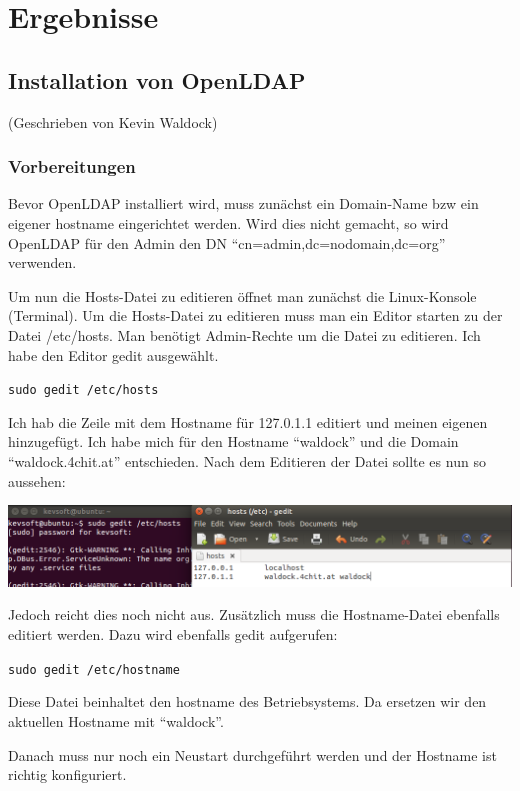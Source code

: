 
\section{Ergebnisse}
\label{sec:Ergebnisse}

\subsection{Installation von OpenLDAP}
(Geschrieben von Kevin Waldock)

\subsubsection{Vorbereitungen}
Bevor OpenLDAP installiert wird, muss zunächst ein Domain-Name bzw ein eigener hostname eingerichtet werden. Wird dies nicht gemacht, so wird OpenLDAP für den Admin den DN ``cn=admin,dc=nodomain,dc=org'' verwenden.

Um nun die Hosts-Datei zu editieren öffnet man zunächst die Linux-Konsole (Terminal). Um die Hosts-Datei zu editieren muss man ein Editor starten zu der Datei /etc/hosts. Man benötigt Admin-Rechte um die Datei zu editieren. Ich habe den Editor gedit ausgewählt.

\verb|sudo gedit /etc/hosts|

Ich hab die Zeile mit dem Hostname für 127.0.1.1 editiert und meinen eigenen hinzugefügt. Ich habe mich für den Hostname ``waldock'' und die Domain ``waldock.4chit.at'' entschieden. Nach dem Editieren der Datei sollte es nun so aussehen:

\begin{center}
	\includegraphics[width=1.0\linewidth]{images/a1_hostsfile.PNG}
\end{center}

Jedoch reicht dies noch nicht aus. Zusätzlich muss die Hostname-Datei ebenfalls editiert werden. Dazu wird ebenfalls gedit aufgerufen:

\verb|sudo gedit /etc/hostname|

Diese Datei beinhaltet den hostname des Betriebsystems. Da ersetzen wir den aktuellen Hostname mit ``waldock''.

Danach muss nur noch ein Neustart durchgeführt werden und der Hostname ist richtig konfiguriert.

